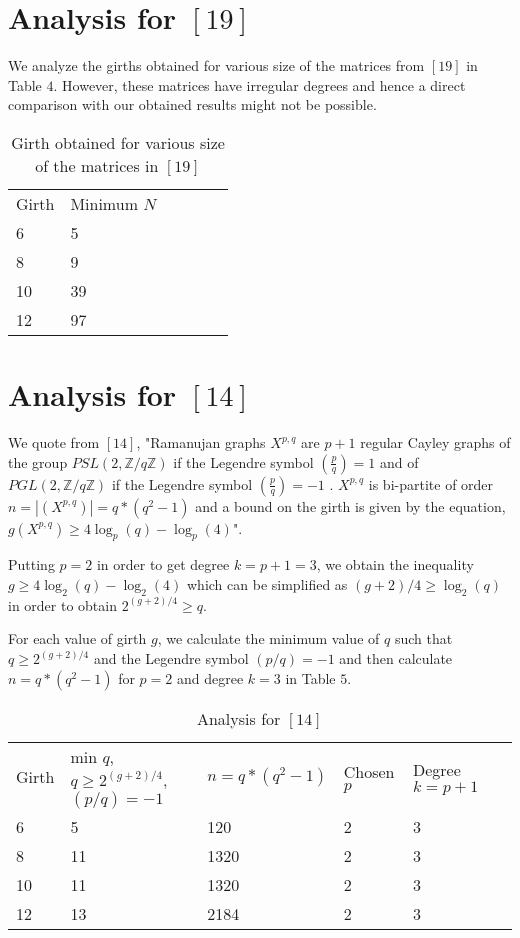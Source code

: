 \documentclass{llncs}
\begin{document}
\section {Analysis for  $[19]$}

We analyze the girths obtained for various size of the matrices from $[19]$ in Table $4$. However, these matrices have irregular degrees and hence a direct comparison with our obtained results might not be possible.

\begin{table}
\caption{Girth obtained for various size of the matrices in  $[19]$}
\begin{tabular}{llllll}
\hline\noalign{\smallskip}
Girth & Minimum $N$ \\
\noalign{\smallskip}
\hline
\noalign{\smallskip}
6 & 5\\
8 & 9\\
10 & 39\\
12 & 97\\
\hline
\end{tabular}
\end{table} 

\section {Analysis for  $[14]$ }

We quote from $[14]$, "Ramanujan graphs $X^{p,q}$ {are } $p+1$ regular Cayley graphs of the group $\mathit{PSL}(2,\mathbb{Z}/q\mathbb{Z})$ if the Legendre symbol $(\frac{p}{q})=1$ and of \  $\mathit{PGL}(2,\mathbb{Z}/q\mathbb{Z})$ {if the Legendre symbol } $(\frac{p}{q})=-1$ . $X^{p,q}$ is bi-partite of order  $n=\left|(X^{p,q})\right|=q\ast (q^{2}-1)$ and a bound on the girth is given by the equation, $g(X^{p,q})\ge 4\log _{p}(q)-\log _{p}(4)$".

Putting $p = 2$ in order to get degree $k = p + 1 = 3$, we obtain the inequality $ g \ge 4\log _{2}(q)-\log _{2}(4)$ which can be simplified as $ (g + 2)/4 \ge \log _{2}(q) $ in order to obtain $2^{(g+2)/4} \ge q $.

For each value of girth $g$, we calculate the minimum value of $q$ such that $q \ge 2^{(g+2)/4}$ and the Legendre symbol  $(p/q) = -1$ and then calculate $n = q \ast (q^2 - 1) $ for $p = 2$ and degree $k = 3$ in Table $5$.

\begin{table}
\caption{Analysis for  $[14]$}
\begin{tabular}{llllll}
\hline\noalign{\smallskip}
Girth & min $q$, $q \ge 2^{(g+2)/4}$, $(p/q) = -1$  & $n = q \ast (q^2 - 1) $ & Chosen $p$ & Degree  $k=p+1$ \\
\noalign{\smallskip}
\hline
\noalign{\smallskip}
6 & 5 & 120 & 2 & 3 \\
8 & 11 & 1320 & 2 & 3  \\
10 & 11 & 1320 & 2 & 3 \\
12 & 13 & 2184 & 2 & 3 \\
\hline
\end{tabular}
\end{table}
\end{document}
